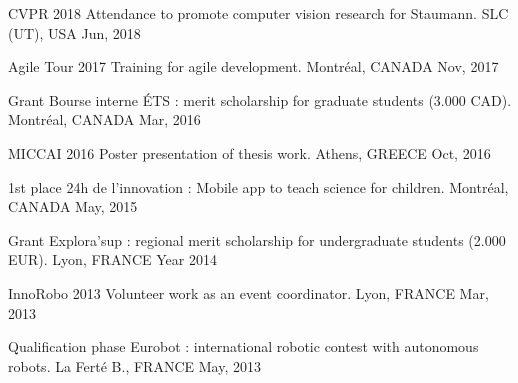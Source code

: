 


\begin{cvhonors}

\cvhonor
{CVPR 2018} %
{Attendance to promote computer vision research for Staumann.} %
{SLC (UT), USA} %
{Jun, 2018} %

\cvhonor
{Agile Tour 2017} %
{Training for agile development.} %
{Montréal, CANADA} %
{Nov, 2017} %

\cvhonor
{Grant} %
{Bourse interne ÉTS : merit scholarship for graduate students (3.000 CAD).} %
{Montréal, CANADA} %
{Mar, 2016} %

\cvhonor
{MICCAI 2016} %
{Poster presentation of thesis work.} %
{Athens, GREECE} %
{Oct, 2016} %

\cvhonor
{1st place} %
{24h de l'innovation : Mobile app to teach science for children.} %
{Montréal, CANADA} %
{May, 2015} %


\cvhonor
{Grant} %
{Explora'sup : regional merit scholarship for undergraduate students (2.000 EUR).} %
{Lyon, FRANCE} %
{Year 2014} %

\cvhonor
{InnoRobo 2013} %
{Volunteer work as an event coordinator.} %
{Lyon, FRANCE} %
{Mar, 2013} %

\cvhonor
{Qualification phase} %
{Eurobot : international robotic contest with autonomous robots.} %
{La Ferté B., FRANCE} %
{May, 2013} %

\end{cvhonors}
